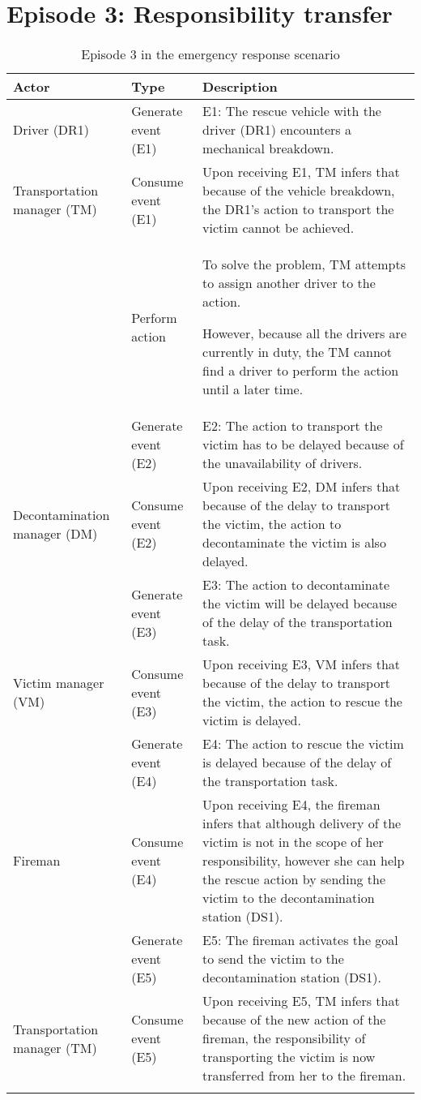 \section{Episode 3: Responsibility transfer} %
\label{sec:episode_3_responsibility_transfer}
\footnotesize
{
\begin{longtable}{>{\raggedright}p{1.2in}>{\raggedright}p{1.2in}>{\raggedright}p{3in}}
\toprule 
\textbf{Actor} & \textbf{Type} & \textbf{Description}\tabularnewline
\midrule 
Driver (DR1) & Generate event (E1) & E1: The rescue vehicle with the driver (DR1) encounters a mechanical
breakdown.\tabularnewline
\midrule 
Transportation manager (TM) & Consume event (E1) & Upon receiving E1, TM infers that because of the vehicle breakdown,
the DR1's action to transport the victim cannot be achieved.\tabularnewline
\midrule 
 & Perform action & To solve the problem, TM attempts to assign another driver to the
action.

However, because all the drivers are currently in duty, the TM cannot
find a driver to perform the action until a later time.\tabularnewline
\midrule 
 & Generate event (E2) & E2: The action to transport the victim has to be delayed because of
the unavailability of drivers.\tabularnewline
\midrule 
Decontamination manager (DM) & Consume event (E2) & Upon receiving E2, DM infers that because of the delay to transport
the victim, the action to decontaminate the victim is also delayed.\tabularnewline
\midrule 
 & Generate event (E3) & E3: The action to decontaminate the victim will be delayed because
of the delay of the transportation task.\tabularnewline
\midrule 
Victim manager (VM) & Consume event (E3) & Upon receiving E3, VM infers that because of the delay to transport
the victim, the action to rescue the victim is delayed.\tabularnewline
\midrule 
 & Generate event (E4) & E4: The action to rescue the victim is delayed because of the delay
of the transportation task.\tabularnewline
\midrule 
Fireman & Consume event (E4) & Upon receiving E4, the fireman infers that although delivery of the
victim is not in the scope of her responsibility, however she can
help the rescue action by sending the victim to the decontamination
station (DS1). \tabularnewline
\midrule 
 & Generate event (E5) & E5: The fireman activates the goal to send the victim to the decontamination
station (DS1). \tabularnewline
\midrule 
Transportation manager (TM) & Consume event (E5) & Upon receiving E5, TM infers that because of the new action of the
fireman, the responsibility of transporting the victim is now transferred
from her to the fireman.\tabularnewline
\bottomrule

	\caption{Episode 3 in the emergency response scenario}
	\label{tab:episode_3_appendix}
	\end{longtable}
}

